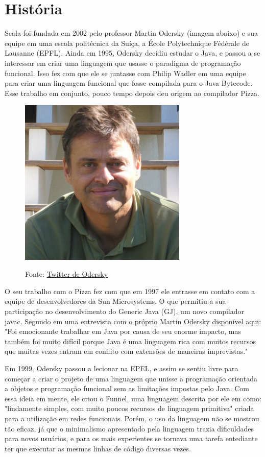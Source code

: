 	\section{História}
	
	Scala foi fundada em 2002 pelo professor Martin Odersky (imagem abaixo) e sua equipe em uma escola politécnica da Suíça, a École Polytechnique Fédérale de Lausanne (EPFL). Ainda em 1995, Odersky decidiu estudar o Java, e passou a se interessar em criar uma linguagem que usasse o paradigma de programação funcional. Isso fez com que ele se juntasse com Philip Wadler em uma equipe para criar uma linguagem funcional que fosse compilada para o Java Bytecode. Esse trabalho em conjunto, pouco tempo depois deu origem ao compilador Pizza.
	
	\begin{figure}[H]
		\centering
		\includegraphics[width=8cm]{Pictures/Odersky}
		\caption{}
		\label{fig:odersky}
		Fonte: \href{https://twitter.com/odersky?s=20}{Twitter de Odersky}
	\end{figure} 
	
	O seu trabalho com o Pizza fez com que em 1997 ele entrasse em contato com a equipe de desenvolvedores da Sun Microsystems. O que permitiu a sua participação no desenvolvimento do Generic Java (GJ), um novo compilador javac. Segundo \cite{Venners} em uma entrevista com o próprio Martin Odersky \href{https://www.artima.com/articles/the-origins-of-scala}{disponível aqui}: "Foi emocionante trabalhar em Java por causa de seu enorme impacto, mas também foi muito difícil porque Java é uma linguagem rica com muitos recursos que muitas vezes entram em conflito com extensões de maneiras imprevistas."
	
	Em 1999, Odersky passou a lecionar na EPEL, e assim se sentiu livre para começar a criar o projeto de uma linguagem que unisse a programação orientada a objetos e programação funcional sem as limitações impostas pelo Java. Com essa ideia em mente, ele criou o Funnel, uma linguagem descrita por ele em \cite{Venners} como: "lindamente simples, com muito poucos recursos de linguagem primitiva" criada para a utilização em redes funcionais. Porém, o uso da linguagem não se mostrou tão eficaz, já que o minimalismo apresentado pela linguagem trazia dificuldades para novos usuários, e para os mais experientes se tornava uma tarefa entediante ter que executar as mesmas linhas de código diversas vezes.
	
